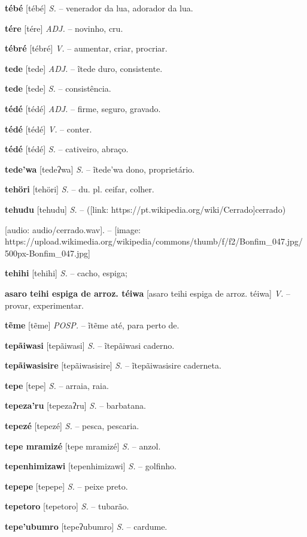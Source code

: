 {{{{\textbf{tébé} [tébé] \textit{S.} -- venerador da lua, adorador da lua.

\textbf{tére} [tére] \textit{ADJ.} -- novinho, cru.

\textbf{tébré} [tébré] \textit{V.} -- aumentar, criar, procriar.

\textbf{tede} [tede] \textit{ADJ.} -- ĩtede duro, consistente.

\textbf{tede} [tede] \textit{S.} -- consistência.

\textbf{tédé} [tédé] \textit{ADJ.} -- firme, seguro, gravado.

\textbf{tédé} [tédé] \textit{V.} -- conter.

\textbf{tédé} [tédé] \textit{S.} -- cativeiro, abraço.

\textbf{tede'wa} [tedeʔwa] \textit{S.} -- ĩtede'wa dono, proprietário.

\textbf{tehöri} [tehöri] \textit{S.} -- du. pl. ceifar, colher.

\textbf{tehudu} [tehudu] \textit{S.} -- ([link: https://pt.wikipedia.org/wiki/Cerrado]cerrado)} [audio: audio/cerrado.wav]{\faHeadphones}. -- [image: https://upload.wikimedia.org/wikipedia/commons/thumb/f/f2/Bonfim_047.jpg/500px-Bonfim_047.jpg]

\textbf{tehihi} [tehihi] \textit{S.} -- cacho, espiga;

\textbf{asaro teihi espiga de arroz. téiwa} [asaro teihi espiga de arroz. téiwa] \textit{V.} -- provar, experimentar.

\textbf{tẽme} [tẽme] \textit{POSP.} -- ĩtẽme até, para perto de.

\textbf{tepãiwasi} [tepãiwasi] \textit{S.} -- ĩtepãiwasi caderno.

\textbf{tepãiwasisire} [tepãiwasisire] \textit{S.} -- ĩtepãiwasisire caderneta.

\textbf{tepe} [tepe] \textit{S.} -- arraia, raia.

\textbf{tepeza'ru} [tepezaʔru] \textit{S.} -- barbatana.

\textbf{tepezé} [tepezé] \textit{S.} -- pesca, pescaria.

\textbf{tepe mramizé} [tepe mramizé] \textit{S.} -- anzol.

\textbf{tepenhimizawi} [tepenhimizawi] \textit{S.} -- golfinho.

\textbf{tepepe} [tepepe] \textit{S.} -- peixe preto.

\textbf{tepetoro} [tepetoro] \textit{S.} -- tubarão.

\textbf{tepe'ubumro} [tepeʔubumro] \textit{S.} -- cardume.

}}}
